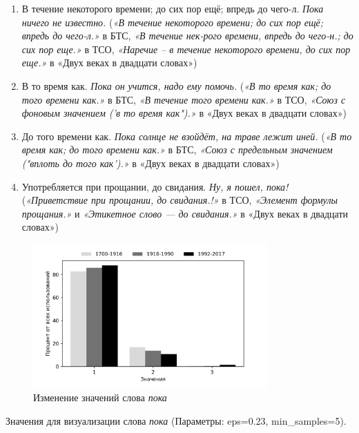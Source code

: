 \documentclass[LI,VKR]{HSEUniversity}
\begin{document}
\begin{enumerate}
    \item В течение некоторого времени; до сих пор ещё; впредь до чего-л. \textit{Пока ничего не известно.}
(\textit{«В течение некоторого времени; до сих пор ещё; впредь до чего-л.»} в БТС,
\textit{«В течение нек-рого времени, впредь до чего-н.; до сих пор еще.»} в ТСО,
\textit{«Наречие – в течение некоторого времени, до сих пор еще.»} в «Двух веках в двадцати словах»)

    \item В то время как. \textit{Пока он учится, надо ему помочь.}
(\textit{«В то время как; до того времени как.»} в БТС,
\textit{«В течение того времени как.»} в ТСО,
\textit{«Союз с фоновым значением (’в то время как").»} в «Двух веках в двадцати словах»)

    \item До того времени как. \textit{Пока солнце не взойдёт, на траве лежит иней.}
(\textit{«В то время как; до того времени как.»} в БТС,
\textit{«Союз с предельным значением ("вплоть до того как’).»} в «Двух веках в двадцати словах»)

    \item Употребляется при прощании, до свидания. \textit{Ну, я пошел, пока!}
(\textit{«Приветствие при прощании, до свидания.!»} в ТСО,
\textit{«Элемент формулы прощания.»} и \textit{«Этикетное слово — до свидания.»} в «Двух веках в двадцати словах»)
\end{enumerate}

\begin{figure}[H]
	\centering
	\includegraphics[width=0.8\textwidth]{img/visualizations/poka_minimal}
	\caption{Изменение значений слова \textit{пока}}
	\label{fig:Пока}
\end{figure}

Значения для визуализации слова \textit{пока} (Параметры: eps=0.23, min\_samples=5).
\end{document}
